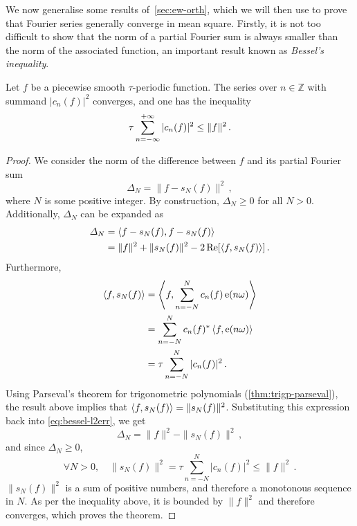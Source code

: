 We now generalise some results of~\cref{sec:ew-orth}, which we will then use to prove that
Fourier series generally converge in mean square. Firstly, it is not too difficult to show
that the norm of a partial Fourier sum is always smaller than the norm of the associated
function, an important result known as \emph{Bessel's inequality}.
\begin{theorem}
  \label{thm:bessel}
  Let $f$ be a piecewise smooth $\tau$-periodic function. The series over $n\in\mathbb{Z}$
  with summand $|c_n(f)|^2$ converges, and one has the inequality
  \begin{equation}
    \tau\sum_{n=-\infty}^{+\infty}|c_n(f)|^2\leq\|f\|^2\,.
  \end{equation}
\end{theorem}
\begin{proof}
  We consider the norm of the difference between $f$ and its partial Fourier sum
  \begin{equation}
    \Delta_N=\|f-s_N(f)\|^2\,,
  \end{equation}
  where $N$ is some positive integer. By construction, $\Delta_N\geq 0$ for all $N>0$.
  Additionally, $\Delta_N$ can be expanded as
  \begin{align}
    \Delta_N&=\braket{f-s_N(f),f-s_N(f)}\\
    &=\|f\|^2+\|s_N(f)\|^2-2\operatorname{Re}[\braket{f,s_N(f)}]\,.\label{eq:bessel-l2err}
  \end{align}
  Furthermore,
  \begin{align}
    \braket{f,s_N(f)}&=\Braket{f,\sum_{n=-N}^{N}c_n(f)\operatorname{e}(n\omega)}\\
    &=\sum_{n=-N}^{N}c_n(f)^*\braket{f,\operatorname{e}(n\omega)}\\
    &=\tau\sum_{n=-N}^{N}|c_n(f)|^2\,.
  \end{align}
  Using Parseval's theorem for trigonometric polynomials (\cref{thm:trigp-parseval}), the
  result above implies that $\braket{f,s_N(f)}=\|s_N(f)\|^2$. Substituting this expression
  back into \cref{eq:bessel-l2err}, we get
  \begin{equation}
    \Delta_N=\|f\|^2-\|s_N(f)\|^2\,,
  \end{equation}
  and since $\Delta_N\geq 0$,
  \begin{equation}
    \forall N>0,\quad \|s_N(f)\|^2=\tau\sum_{n=-N}^{N}|c_n(f)|^2\leq \|f\|^2\,.
  \end{equation}
  $\|s_N(f)\|^2$ is a sum of positive numbers, and therefore a monotonous sequence in $N$.
  As per the inequality above, it is bounded by $\|f\|^2$ and therefore converges, which
  proves the theorem.
\end{proof}
